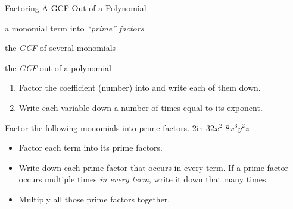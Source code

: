 \documentclass[letterpaper,9pt]{memoir}
\begin{document}

\pagestyle{myPagestyle}

\checkandfixthelayout
{}
\begin{myNotesHeader}{Factoring A GCF Out of a Polynomial}
    \item {} a monomial term into \emph{``prime'' factors}
    \item {} the \emph{GCF} of several monomials
    \item {} the \emph{GCF} out of a polynomial
\end{myNotesHeader}
  
\begin{myKeyConcepts}
    \begin{enumerate}
    \item Factor the coefficient (number) into 
    and write each of them down.
    \item Write each variable down a number of times equal to its exponent.
    \end{enumerate}
\end{myKeyConcepts}


\begin{myProblems2}%
    {Factor the following monomials into prime factors.}%
    {2in}%
    {\( 32x^2 \)}
    {\( 8 x^3y^2z \)}
\end{myProblems2}
  
\begin{myKeyConcepts}
    \begin{itemize}
    \item Factor each term into its prime factors.
    \item Write down each prime factor that occurs in every term. 
    If a prime factor occurs multiple times \emph{in every term}, 
    write it down that many times.
    \item Multiply all those prime factors together.
    \end{itemize}
\end{myKeyConcepts}
\end{document}
